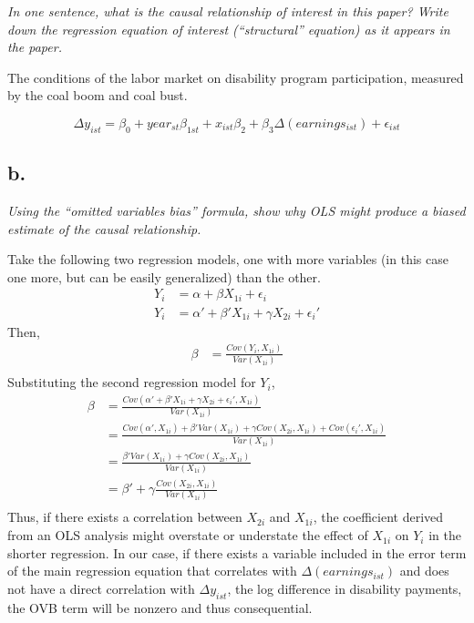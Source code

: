 \documentclass[
]{article}
\begin{document}
\textit{In one sentence, what is the causal relationship of interest in this paper? Write down the regression equation of interest (“structural” equation) as it appears in the paper.}

The conditions of the labor market on disability program participation,
measured by the coal boom and coal bust.

\[\Delta y_{ist} = \beta_0 + year_{st}\beta_{1st} + x_{ist}\beta_2 + \beta_{3}\Delta (earnings_{ist}) + \epsilon_{ist}\]

\hypertarget{b.-4}{%
\subsection{b.}\label{b.-4}}

\textit{Using the “omitted variables bias” formula, show why OLS might produce a biased estimate of the causal relationship.}

Take the following two regression models, one with more variables (in
this case one more, but can be easily generalized) than the other.
\[\begin{aligned}
Y_i &= \alpha + \beta X_{1i} + \epsilon_i \\
Y_i &= \alpha' + \beta' X_{1i} + \gamma X_{2i} + \epsilon_i'
\end{aligned}\] Then, \[\begin{aligned}
\beta &= \frac{Cov(Y_i, X_{1i})}{Var(X_{1i})} \\
\end{aligned}\] Substituting the second regression model for \(Y_i\),
\[\begin{aligned}
\beta &= \frac{Cov(\alpha' + \beta' X_{1i} + \gamma X_{2i} + \epsilon_i', X_{1i})}{Var(X_{1i})} \\
&= \frac{Cov(\alpha', X_{1i}) + \beta' Var(X_{1i}) + \gamma Cov(X_{2i}, X_{1i}) + Cov(\epsilon_i', X_{1i})}{Var(X_{1i})} \\
&= \frac{\beta' Var(X_{1i}) + \gamma Cov(X_{2i}, X_{1i})}{Var(X_{1i})} \\
&= \beta' + \gamma\frac{Cov(X_{2i}, X_{1i})}{Var(X_{1i})} \\
\end{aligned}\] Thus, if there exists a correlation between \(X_{2i}\)
and \(X_{1i}\), the coefficient derived from an OLS analysis might
overstate or understate the effect of \(X_{1i}\) on \(Y_i\) in the
shorter regression. In our case, if there exists a variable included in
the error term of the main regression equation that correlates with
\(\Delta(earnings_{ist})\) and does not have a direct correlation with
\(\Delta y_{ist}\), the log difference in disability payments, the OVB
term will be nonzero and thus consequential.
\end{document}
